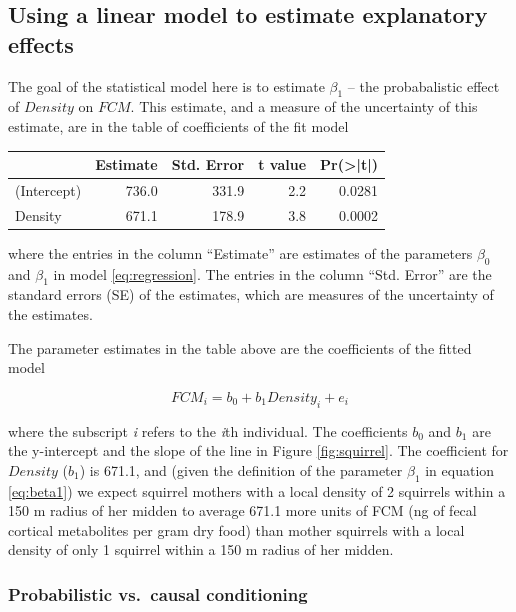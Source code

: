 \documentclass[]{book}
\theoremstyle{definition}
\theoremstyle{definition}
\theoremstyle{definition}
\theoremstyle{remark}
\begin{document}
\subsection{Using a linear model to estimate explanatory
effects}\label{using-a-linear-model-to-estimate-explanatory-effects}

The goal of the statistical model here is to estimate \(\beta_1\) -- the
probabalistic effect of \(Density\) on \(FCM\). This estimate, and a
measure of the uncertainty of this estimate, are in the table of
coefficients of the fit model

\begin{tabular}{l|r|r|r|r}
\hline
  & Estimate & Std. Error & t value & Pr(>|t|)\\
\hline
(Intercept) & 736.0 & 331.9 & 2.2 & 0.0281\\
\hline
Density & 671.1 & 178.9 & 3.8 & 0.0002\\
\hline
\end{tabular}

where the entries in the column ``Estimate'' are estimates of the
parameters \(\beta_0\) and \(\beta_1\) in model \eqref{eq:regression}. The
entries in the column ``Std. Error'' are the standard errors (SE) of the
estimates, which are measures of the uncertainty of the estimates.

The parameter estimates in the table above are the coefficients of the
fitted model

\begin{equation}
FCM_i = b_0 + b_1 Density_i + e_i
\label{eq:fcmi}
\end{equation}

where the subscript \emph{i} refers to the \emph{i}th individual. The
coefficients \(b_0\) and \(b_1\) are the y-intercept and the slope of
the line in Figure \ref{fig:squirrel}. The coefficient for \(Density\)
(\(b_1\)) is 671.1, and (given the definition of the parameter
\(\beta_1\) in equation \eqref{eq:beta1}) we expect squirrel mothers with
a local density of 2 squirrels within a 150 m radius of her midden to
average 671.1 more units of FCM (ng of fecal cortical metabolites per
gram dry food) than mother squirrels with a local density of only 1
squirrel within a 150 m radius of her midden.

\subsubsection{Probabilistic vs.~causal
conditioning}\label{probabilistic-vs.causal-conditioning}
\end{document}
